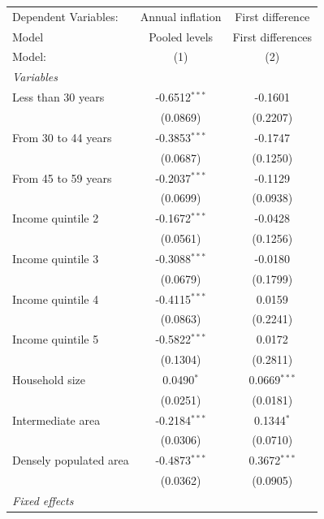 
\begingroup
\centering
\begin{tabular}{lcc}
   \tabularnewline \midrule \midrule
   Dependent Variables:   & Annual inflation & First difference\\  
   Model                  & Pooled levels    & First differences \\   
   Model:                 & (1)              & (2)\\  
   \midrule
   \emph{Variables}\\
   Less than 30 years     & -0.6512$^{***}$  & -0.1601\\   
                          & (0.0869)         & (0.2207)\\   
   From 30 to 44 years    & -0.3853$^{***}$  & -0.1747\\   
                          & (0.0687)         & (0.1250)\\   
   From 45 to 59 years    & -0.2037$^{***}$  & -0.1129\\   
                          & (0.0699)         & (0.0938)\\   
   Income quintile 2      & -0.1672$^{***}$  & -0.0428\\   
                          & (0.0561)         & (0.1256)\\   
   Income quintile 3      & -0.3088$^{***}$  & -0.0180\\   
                          & (0.0679)         & (0.1799)\\   
   Income quintile 4      & -0.4115$^{***}$  & 0.0159\\   
                          & (0.0863)         & (0.2241)\\   
   Income quintile 5      & -0.5822$^{***}$  & 0.0172\\   
                          & (0.1304)         & (0.2811)\\   
   Household size         & 0.0490$^{*}$     & 0.0669$^{***}$\\   
                          & (0.0251)         & (0.0181)\\   
   Intermediate area      & -0.2184$^{***}$  & 0.1344$^{*}$\\   
                          & (0.0306)         & (0.0710)\\   
   Densely populated area & -0.4873$^{***}$  & 0.3672$^{***}$\\   
                          & (0.0362)         & (0.0905)\\   
   \midrule
   \emph{Fixed effects}\\

\end{tabular}
